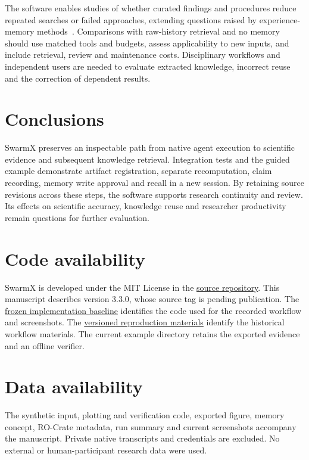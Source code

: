 \documentclass[preprint,12pt,a4paper]{elsarticle}
\begin{document}
The software enables studies of whether curated findings and procedures reduce repeated
searches or failed approaches, extending questions raised by experience-memory
methods~\cite{wang2023voyager,wang2024workflowmemory}. Comparisons with raw-history retrieval
and no memory should use matched tools and budgets, assess applicability to new inputs,
and include retrieval, review and maintenance costs. Disciplinary workflows and independent
users are needed to evaluate extracted knowledge, incorrect reuse and the correction of
dependent results.

\section{Conclusions}
\label{sec:conclusions}

SwarmX preserves an inspectable path from native agent execution to scientific evidence and
subsequent knowledge retrieval. Integration tests and the guided example demonstrate artifact
registration, separate recomputation, claim recording, memory write approval and recall in a new
session. By retaining source revisions across these steps, the software supports research
continuity and review. Its effects on scientific accuracy, knowledge reuse and researcher
productivity remain questions for further evaluation.

\section*{Code availability}

SwarmX is developed under the MIT License in the
\href{https://github.com/tcztzy/swarmx}{source repository}. This manuscript describes version
3.3.0, whose source tag is pending publication. The
\href{https://github.com/tcztzy/swarmx/tree/9e1e818acd438dcbf30fb9dc46d758495d24d094}{frozen implementation baseline}
identifies the code used for the recorded workflow and screenshots. The
\href{https://github.com/tcztzy/swarmx/tree/d564ae641a839564a11b41d8aa3b61617556e625/examples/softwarex/current-release}{versioned reproduction materials}
identify the historical workflow materials. The current example directory retains the exported
evidence and an offline verifier.

\section*{Data availability}

The synthetic input, plotting and verification code, exported figure, memory concept, RO-Crate
metadata, run summary and current screenshots accompany the manuscript. Private native
transcripts and credentials are excluded. No external or human-participant research data were used.
\end{document}
